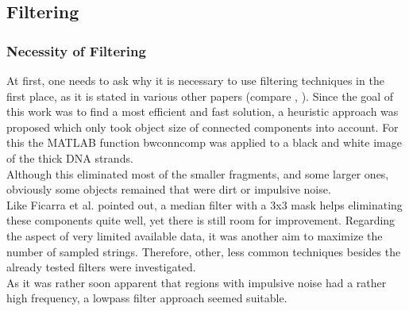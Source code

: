\documentclass{article}
\begin{document}
\newpage
\subsection{Filtering}\label{sec:Filtering}
\subsubsection{Necessity of Filtering}
At first, one needs to ask why it is necessary to use filtering techniques in the first place, as it is stated in various other papers (compare \cite{ficarra2005automated}, \cite{ficarra2005automated}). Since the goal of this work was to find a most efficient and fast solution, a heuristic approach was proposed which only took object size of connected components into account. For this the MATLAB function bwconncomp was applied to a black and white image of the thick DNA strands.\\
Although this eliminated most of the smaller fragments, and some larger ones, obviously some objects remained that were dirt or impulsive noise. \\
Like Ficarra et al. \cite{ficarra2005automated} pointed out, a median filter with a 3x3 mask helps eliminating these components quite well, yet there is still room for improvement. Regarding the aspect of very limited available data, it was another aim to maximize the number of sampled strings. Therefore, other, less common techniques besides the already tested filters were investigated.\\
As it was rather soon apparent that regions with impulsive noise had a rather high frequency, a lowpass filter approach seemed suitable.
\end{document}
